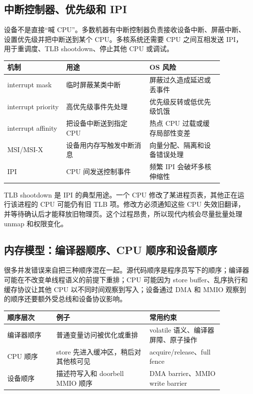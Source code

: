 \subsection{中断控制器、优先级和 IPI}

设备不是直接“喊 CPU”。多数机器有中断控制器负责接收设备中断、屏蔽中断、设置优先级并把中断送到某个 CPU。多核系统还需要 CPU 之间互相发送 IPI，用于重调度、TLB shootdown、停止其他 CPU 或调试。

\begin{longtable}{p{0.24\linewidth}p{0.34\linewidth}p{0.3\linewidth}}
\toprule
机制 & 用途 & OS 风险 \\
\midrule
interrupt mask & 临时屏蔽某类中断 & 屏蔽过久造成延迟或丢事件 \\
interrupt priority & 高优先级事件先处理 & 优先级反转或低优先级饥饿 \\
interrupt affinity & 把设备中断送到指定 CPU & 热点 CPU 过载或缓存局部性变差 \\
MSI/MSI-X & 设备用内存写触发中断消息 & 向量分配、隔离和设备错误处理 \\
IPI & CPU 间发送控制事件 & 频繁 IPI 会破坏多核伸缩性 \\
\bottomrule
\end{longtable}

TLB shootdown 是 IPI 的典型用途。一个 CPU 修改了某进程页表，其他正在运行该进程的 CPU 可能仍有旧 TLB 项。修改方必须通知这些 CPU 失效旧翻译，并等待确认后才能释放旧物理页。这个过程昂贵，所以现代内核会尽量批量处理 unmap 和权限变化。

\subsection{内存模型：编译器顺序、CPU 顺序和设备顺序}

很多并发错误来自把三种顺序混在一起。源代码顺序是程序员写下的顺序；编译器可能在不改变单线程语义的前提下重排；CPU 可能因为 store buffer、乱序执行和缓存协议让其他 CPU 以不同时间观察到写入；设备通过 DMA 和 MMIO 观察到的顺序还要额外受总线和设备协议影响。

\begin{longtable}{p{0.2\linewidth}p{0.38\linewidth}p{0.3\linewidth}}
\toprule
顺序层次 & 例子 & 常用约束 \\
\midrule
编译器顺序 & 普通变量访问被优化或重排 & volatile 语义、编译器屏障、原子操作 \\
CPU 顺序 & store 先进入缓冲区，稍后对其他核可见 & acquire/release、full fence \\
设备顺序 & 描述符写入和 doorbell MMIO 顺序 & DMA barrier、MMIO write barrier \\
\bottomrule
\end{longtable}

